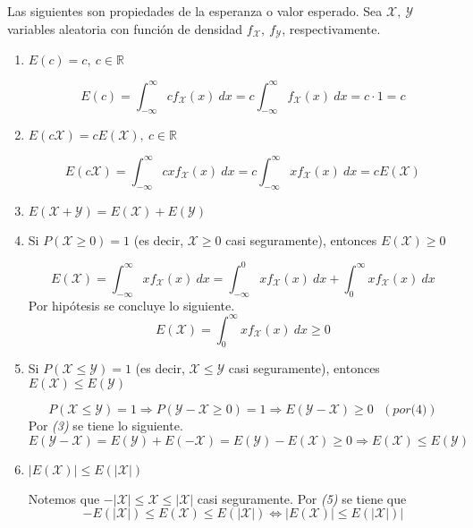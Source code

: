 Las siguientes son propiedades de la esperanza o valor esperado. Sea $\mathcal X,~ \mathcal Y$ variables aleatoria con función de densidad $f_{\mathcal X},~ f_{\mathcal Y}$, respectivamente.
\begin{enumerate}
  \item $E(c) = c,~ c \in \mathbb R$
    \begin{myproof}
      \[E(c) = \int_{-\infty}^{\infty} c f_{\mathcal X}(x)~dx = c \int_{-\infty}^{\infty} f_{\mathcal X}(x)~dx = c \cdot 1 = c\]
    \end{myproof}
  \item $E(c \mathcal X) = c E(\mathcal X),~ c \in \mathbb R$
    \begin{myproof}
      \[E(c\mathcal X) = \int_{-\infty}^{\infty} cx f_{\mathcal X}(x)~dx = c \int_{-\infty}^{\infty} xf_{\mathcal X}(x)~dx = c E(\mathcal X)\]
    \end{myproof}
  \item $E(\mathcal X + \mathcal Y) = E(\mathcal X) + E(\mathcal Y)$
  \item Si $P(\mathcal X \ge 0) = 1$ (es decir, $\mathcal X \ge 0$ casi seguramente), entonces $E(\mathcal X) \ge 0$
    \begin{myproof}
      \[E(\mathcal X) = \int_{-\infty}^{\infty} x f_{\mathcal X}(x)~dx = \int_{-\infty}^{0} xf_{\mathcal X}(x)~dx + \int_{0}^{\infty} xf_{\mathcal X}(x)~dx\]
      Por hipótesis se concluye lo siguiente.
      \[E(\mathcal X) = \int_{0}^{\infty} xf_{\mathcal X}(x)~dx \ge 0\]
    \end{myproof}
  \item Si $P(\mathcal X \le \mathcal Y) = 1$ (es decir, $\mathcal X \le \mathcal Y$ casi seguramente), entonces $E(\mathcal X) \le E(\mathcal Y)$
    \begin{myproof}
      \[P(\mathcal X \le \mathcal Y) = 1 \Longrightarrow P(\mathcal Y - \mathcal X \ge 0) = 1 \Longrightarrow E(\mathcal Y - \mathcal X) \ge 0 ~~~(por \textit{(4)})\]
      Por \textit{(3)} se tiene lo siguiente.
      \[E(\mathcal Y - \mathcal X) = E(\mathcal Y) + E(\mathcal {-X}) = E(\mathcal Y) - E(\mathcal X) \ge 0 \Longrightarrow E(\mathcal X) \le E(\mathcal Y) \]
    \end{myproof}
  \item $|E(\mathcal X)| \le E(|\mathcal X|)$
    \begin{myproof}
      Notemos que $- |\mathcal X| \le \mathcal X \le |\mathcal X|$ casi seguramente.
      Por \textit{(5)} se tiene que
      \[-E(|\mathcal X|) \le E(\mathcal X) \le E(|\mathcal X|)
        \Longleftrightarrow
      |E(\mathcal X)| \le E(|\mathcal X|)|\]
    \end{myproof}
\end{enumerate}


